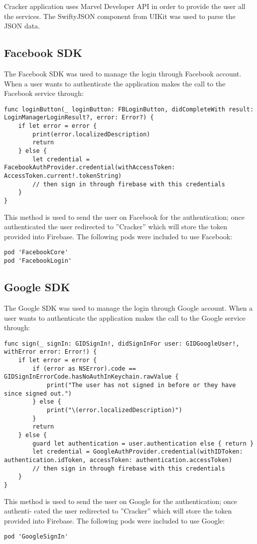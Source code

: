 Cracker application uses Marvel Developer API in order to provide the user all the services. The SwiftyJSON component from UIKit was used to parse the JSON data.

\vspace{8mm}

\subsection{Facebook SDK}
The Facebook SDK was used to manage the login through Facebook account. When a user wants to authenticate the application makes the call to the Facebook service through:
\begin{lstlisting}
func loginButton(_ loginButton: FBLoginButton, didCompleteWith result: LoginManagerLoginResult?, error: Error?) {
	if let error = error {
		print(error.localizedDescription)
		return
	} else {
		let credential = FacebookAuthProvider.credential(withAccessToken: AccessToken.current!.tokenString)
		// then sign in through firebase with this credentials
	} 
}
\end{lstlisting}

This method is used to send the user on Facebook for the authentication; once authenticated the user redirected to ”Cracker” which will store the token provided into Firebase.
The following pods were included to use Facebook:

\begin{lstlisting}
pod 'FacebookCore'
pod 'FacebookLogin'
\end{lstlisting}

\clearpage
  
  
\subsection{Google SDK}
The Google SDK was used to manage the login through Google account. When a user wants to authenticate the application makes the call to the Google service through:
\begin{lstlisting}
func sign(_ signIn: GIDSignIn!, didSignInFor user: GIDGoogleUser!, withError error: Error!) {
	if let error = error {
		if (error as NSError).code == GIDSignInErrorCode.hasNoAuthInKeychain.rawValue {
			print("The user has not signed in before or they have since signed out.")
		} else {
			print("\(error.localizedDescription)")
		}
		return
	} else {
		guard let authentication = user.authentication else { return }
		let credential = GoogleAuthProvider.credential(withIDToken: authentication.idToken, accessToken: authentication.accessToken)
		// then sign in through firebase with this credentials
	}
}
\end{lstlisting}
This method is used to send the user on Google for the authentication; once authenti- cated the user redirected to ”Cracker” which will store the token provided into Firebase.
The following pods were included to use Google:
\begin{lstlisting}
pod 'GoogleSignIn'
\end{lstlisting}
    
